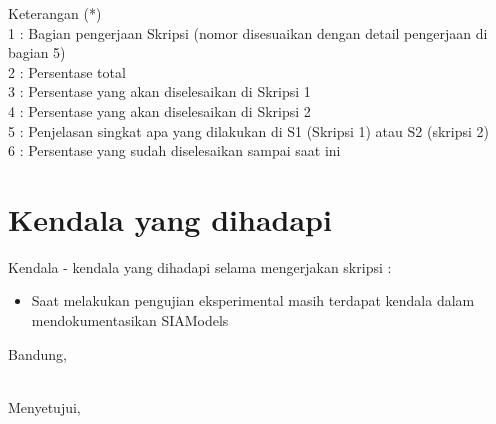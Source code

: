 \documentclass[a4paper,twoside]{article}
\begin{document}
Keterangan (*)\\
1 : Bagian pengerjaan Skripsi (nomor disesuaikan dengan detail pengerjaan di bagian 5)\\
2 : Persentase total \\
3 : Persentase yang akan diselesaikan di Skripsi 1 \\
4 : Persentase yang akan diselesaikan di Skripsi 2 \\
5 : Penjelasan singkat apa yang dilakukan di S1 (Skripsi 1) atau S2 (skripsi 2)\\
6 : Persentase yang sudah diselesaikan sampai saat ini 

\section{Kendala yang dihadapi}
Kendala - kendala yang dihadapi selama mengerjakan skripsi :
\begin{itemize}
	\item Saat melakukan pengujian eksperimental masih terdapat kendala dalam mendokumentasikan SIAModels
\end{itemize}

\vspace{1cm}
\centering Bandung, \tanggal\\
\vspace{2cm} \nama \\ 
\vspace{1cm}

Menyetujui, \\
\end{document}
